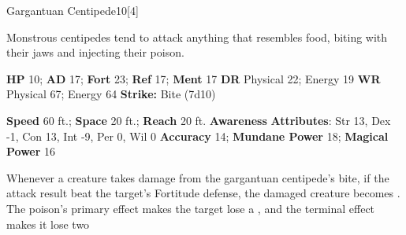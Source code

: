   
  \begin{monsection}{Gargantuan Centipede}{10}[4]
    \vspace{-1em}\vspace{-1em}
    \vspace{0em}

    
    Monstrous centipedes tend to attack anything that resembles food, biting with their jaws and injecting their poison.
  

    \begin{spellcontent}
      \begin{spelltargetinginfo}
        \pari \textbf{HP} 10;
          \textbf{AD} 17;
          \textbf{Fort} 23;
          \textbf{Ref} 17;
          \textbf{Ment} 17
        \pari \textbf{DR} Physical 22; Energy 19
        \pari \textbf{WR} Physical 67; Energy 64
        \pari \textbf{Strike:}
            Bite  (7d10)
      \end{spelltargetinginfo}
    \end{spellcontent}
    \begin{monsterfooter}
      \pari \textbf{Speed} 60 ft.;
        \textbf{Space} 20 ft.;
        \textbf{Reach} 20 ft.
      \pari \textbf{Awareness} 
      \pari \textbf{Attributes}:
        Str 13, Dex -1,
        Con 13, Int -9,
        Per 0, Wil 0
      \pari \textbf{Accuracy} 14;
        \textbf{Mundane Power} 18;
      \textbf{Magical Power} 16
    \end{monsterfooter}
  \end{monsection}
    Whenever a creature takes damage from the gargantuan centipede's bite,
      if the attack result beat the target's Fortitude defense,
      the damaged creature becomes .
    The poison's primary effect makes the target lose a , and the terminal effect makes it lose two 
  

